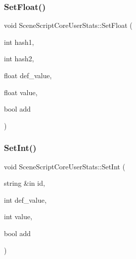 \hypertarget{class_scene_script_core_user_stats_a87bd324cede646bc24650d3cf7324691}{}\label{class_scene_script_core_user_stats_a87bd324cede646bc24650d3cf7324691} 
\subsubsection{\texorpdfstring{Set\+Float()}{SetFloat()}\hspace{0.1cm}{\footnotesize\ttfamily [2/2]}}
{\footnotesize\ttfamily void Scene\+Script\+Core\+User\+Stats\+::\+Set\+Float (\begin{DoxyParamCaption}\item[{int}]{hash1,  }\item[{int}]{hash2,  }\item[{float}]{def\+\_\+value,  }\item[{float}]{value,  }\item[{bool}]{add }\end{DoxyParamCaption})}

\hypertarget{class_scene_script_core_user_stats_adeb607731443bdb88c8fafc311226587}{}\label{class_scene_script_core_user_stats_adeb607731443bdb88c8fafc311226587} 
\subsubsection{\texorpdfstring{Set\+Int()}{SetInt()}\hspace{0.1cm}{\footnotesize\ttfamily [1/2]}}
{\footnotesize\ttfamily void Scene\+Script\+Core\+User\+Stats\+::\+Set\+Int (\begin{DoxyParamCaption}\item[{string \&in}]{id,  }\item[{int}]{def\+\_\+value,  }\item[{int}]{value,  }\item[{bool}]{add }\end{DoxyParamCaption})}

\hypertarget{class_scene_script_core_user_stats_adae99b6ee6ff220effdd6013ccc49adc}{}\label{class_scene_script_core_user_stats_adae99b6ee6ff220effdd6013ccc49adc} 
